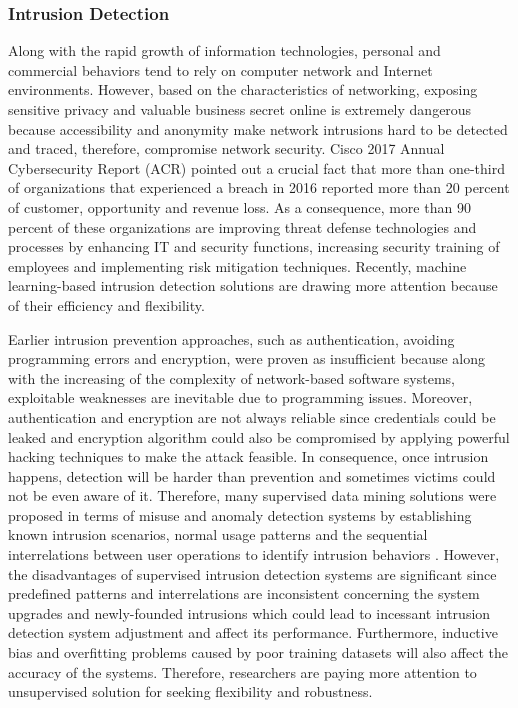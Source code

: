 \subsubsection{Intrusion Detection}
\label{sec:2.5.2}

Along with the rapid growth of information technologies, personal and commercial behaviors tend to rely on computer network and Internet environments. However, based on the characteristics of networking, exposing sensitive privacy and valuable business secret online is extremely dangerous because accessibility and anonymity make network intrusions hard to be detected and traced, therefore, compromise network security. Cisco 2017 Annual Cybersecurity Report (ACR) \cite{Cisco2017} pointed out a crucial fact that more than one-third of organizations that experienced a breach in 2016 reported more than 20 percent of customer, opportunity and revenue loss. As a consequence, more than 90 percent of these organizations are improving threat defense technologies and processes by enhancing IT and security functions, increasing security training of employees and implementing risk mitigation techniques. Recently, machine learning-based intrusion detection solutions \cite{Buczak2016,Ashfaq2017} are drawing more attention because of their efficiency and flexibility. 

Earlier intrusion prevention approaches, such as authentication, avoiding programming errors and encryption, were proven as insufficient because along with the increasing of the complexity of network-based software systems, exploitable weaknesses are inevitable due to programming issues. Moreover, authentication and encryption are not always reliable since credentials could be leaked and encryption algorithm could also be compromised by applying powerful hacking techniques to make the attack feasible. In consequence, once intrusion happens, detection will be harder than prevention and sometimes victims could not be even aware of it. Therefore, many supervised data mining solutions were proposed in terms of misuse and anomaly detection systems by establishing known intrusion scenarios, normal usage patterns and the sequential interrelations between user operations to identify intrusion behaviors \cite{Lee1998}. However, the disadvantages of supervised intrusion detection systems are significant since predefined patterns and interrelations are inconsistent concerning the system upgrades and newly-founded intrusions which could lead to incessant intrusion detection system adjustment and affect its performance. Furthermore, inductive bias and overfitting problems caused by poor training datasets will also affect the accuracy of the systems. Therefore, researchers are paying more attention to unsupervised solution \cite{Bouguila2011,Azam2015} for seeking flexibility and robustness.

